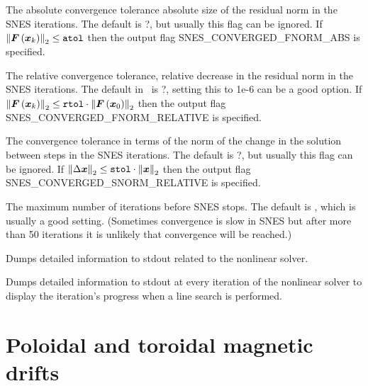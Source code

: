 \myhrule

{The absolute convergence tolerance absolute size of the residual norm in the SNES iterations. 
The default is {\ttfamily ?}, but usually this flag can be ignored. 
If $\left\|\bm{F} \left(\bm{x}_{k}\right)\right\|_2 \leq \text{\ttfamily atol}$ then the output flag {\ttfamily SNES\_CONVERGED\_FNORM\_ABS} is specified.}

\myhrule

{The relative convergence tolerance, relative decrease in the residual norm in the SNES iterations. 
The default in \PETSc~is {\ttfamily ?}, setting this to {\ttfamily 1e-6} can be a good option. 
If $\left\|\bm{F} \left(\bm{x}_{k}\right)\right\|_2 \leq \text{\ttfamily rtol} \cdot \left\|\bm{F} \left(\bm{x}_{0}\right)\right\|_2$ then the output flag {\ttfamily SNES\_CONVERGED\_FNORM\_RELATIVE} is specified.}

\myhrule

{The convergence tolerance in terms of the norm of the change in the solution between steps in the SNES iterations.
The default is {\ttfamily ?}, but usually this flag can be ignored. 
If $\left\|\Delta \bm{x}\right\|_2 \leq \text{\ttfamily stol} \cdot \left\|\bm{x}\right\|_2$ then the output flag {\ttfamily SNES\_CONVERGED\_SNORM\_RELATIVE} is specified.}

\myhrule

{The maximum number of iterations before SNES stops. 
The default is {}, which is usually a good setting. (Sometimes convergence is slow in SNES but after more than 50 iterations it is unlikely that convergence will be reached.)} 

\myhrule

{Dumps detailed information to stdout related to the nonlinear solver.}

\myhrule

{Dumps detailed information to stdout at every iteration of the nonlinear solver to display the iteration's progress when a line search is performed.}


\section{Poloidal and toroidal magnetic drifts}
\label{sec:magneticDrifts}

